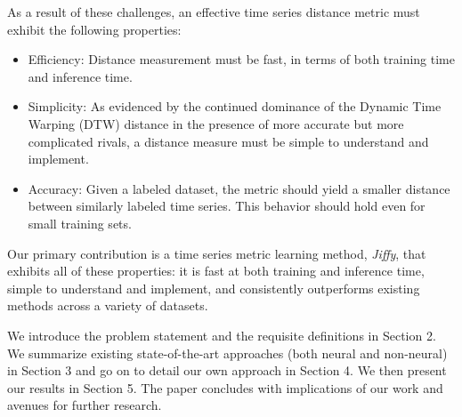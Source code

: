 As a result of these challenges, an effective time series distance metric must exhibit the following properties:
\begin{itemize}
	\item Efficiency: Distance measurement must be fast, in terms of both training time and inference time.
	\item Simplicity: As evidenced by the continued dominance of the Dynamic Time Warping (DTW) distance \citep{dtw} in the presence of more accurate but more complicated rivals, a distance measure must be simple to understand and implement.
	\item Accuracy: Given a labeled dataset, the metric should yield a smaller distance between similarly labeled time series. This behavior should hold even for small training sets.
\end{itemize}

Our primary contribution is a time series metric learning method, \textit{Jiffy}, that exhibits all of these properties: it is fast at both training and inference time, simple to understand and implement, and consistently outperforms existing methods across a variety of datasets.

We introduce the problem statement and the requisite definitions in Section 2. We summarize existing state-of-the-art approaches (both neural and non-neural) in Section 3 and go on to detail our own approach in Section 4. We then present our results in Section 5. The paper concludes with implications of our work and avenues for further research.



